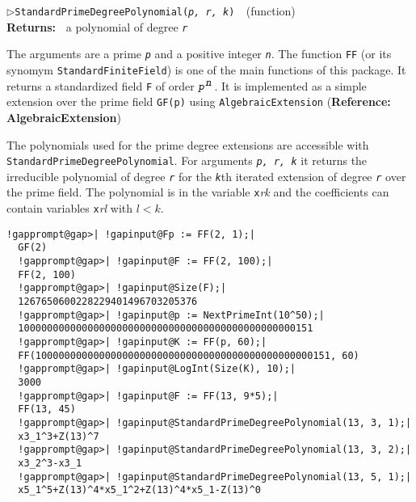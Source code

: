 \documentclass[a4paper,11pt]{report}
\begin{document}
{{{\noindent\textcolor{FuncColor}{$\triangleright$\enspace\texttt{StandardPrimeDegreePolynomial({\mdseries\slshape p, r, k})
\label{StandardPrimeDegreePolynomial}
}\hfill{\scriptsize (function)}}\\
\textbf{\indent Returns:\ }
a polynomial of degree \mbox{\texttt{\mdseries\slshape r}}



 The arguments are a prime \mbox{\texttt{\mdseries\slshape p}} and a positive integer \mbox{\texttt{\mdseries\slshape n}}. The function \texttt{FF} (or its synomym \texttt{StandardFiniteField}) is one of the main functions of this package. It returns a standardized
field \texttt{F} of order $\mbox{\texttt{\mdseries\slshape p}}^{\mbox{\texttt{\mdseries\slshape n}}}$. It is implemented as a simple extension over the prime field \texttt{GF(p)} using \texttt{AlgebraicExtension} (\textbf{Reference: AlgebraicExtension}) 

 The polynomials used for the prime degree extensions are accessible with \texttt{StandardPrimeDegreePolynomial}. For arguments \mbox{\texttt{\mdseries\slshape p, r, k}} it returns the irreducible polynomial of degree \mbox{\texttt{\mdseries\slshape r}} for the \mbox{\texttt{\mdseries\slshape k}}\texttt{}th iterated extension of degree \mbox{\texttt{\mdseries\slshape r}} over the prime field. The polynomial is in the variable \texttt{x}\emph{r}\texttt{{\textunderscore}}\emph{k} and the coefficients can contain variables \texttt{x}\emph{r}\texttt{{\textunderscore}}\emph{l} with $l < k$. 

 
\begin{Verbatim}[commandchars=!@|,fontsize=\small,frame=single,label=Example]
  !gapprompt@gap>| !gapinput@Fp := FF(2, 1);|
  GF(2)
  !gapprompt@gap>| !gapinput@F := FF(2, 100);|
  FF(2, 100)
  !gapprompt@gap>| !gapinput@Size(F);|
  1267650600228229401496703205376
  !gapprompt@gap>| !gapinput@p := NextPrimeInt(10^50);|
  100000000000000000000000000000000000000000000000151
  !gapprompt@gap>| !gapinput@K := FF(p, 60);|
  FF(100000000000000000000000000000000000000000000000151, 60)
  !gapprompt@gap>| !gapinput@LogInt(Size(K), 10);|
  3000
  !gapprompt@gap>| !gapinput@F := FF(13, 9*5);|
  FF(13, 45)
  !gapprompt@gap>| !gapinput@StandardPrimeDegreePolynomial(13, 3, 1);|
  x3_1^3+Z(13)^7
  !gapprompt@gap>| !gapinput@StandardPrimeDegreePolynomial(13, 3, 2);|
  x3_2^3-x3_1
  !gapprompt@gap>| !gapinput@StandardPrimeDegreePolynomial(13, 5, 1);|
  x5_1^5+Z(13)^4*x5_1^2+Z(13)^4*x5_1-Z(13)^0
\end{Verbatim}
 }

}}
\end{document}
